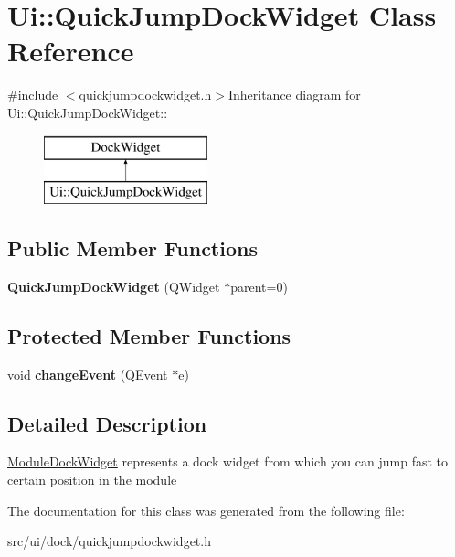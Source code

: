 \hypertarget{classUi_1_1QuickJumpDockWidget}{
\section{Ui::QuickJumpDockWidget Class Reference}
\label{classUi_1_1QuickJumpDockWidget}
}


{\ttfamily \#include $<$quickjumpdockwidget.h$>$}Inheritance diagram for Ui::QuickJumpDockWidget::\begin{figure}[H]
\begin{center}
\leavevmode
\includegraphics[height=2cm]{classUi_1_1QuickJumpDockWidget}
\end{center}
\end{figure}
\subsection*{Public Member Functions}
\begin{DoxyCompactItemize}
\item 
\hypertarget{classUi_1_1QuickJumpDockWidget_a1e8fdb124c87cce47f03634e7721a7e0}{
{\bfseries QuickJumpDockWidget} (QWidget $\ast$parent=0)}
\label{classUi_1_1QuickJumpDockWidget_a1e8fdb124c87cce47f03634e7721a7e0}

\end{DoxyCompactItemize}
\subsection*{Protected Member Functions}
\begin{DoxyCompactItemize}
\item 
\hypertarget{classUi_1_1QuickJumpDockWidget_a548ca89b6936292be2e618572e62f04a}{
void {\bfseries changeEvent} (QEvent $\ast$e)}
\label{classUi_1_1QuickJumpDockWidget_a548ca89b6936292be2e618572e62f04a}

\end{DoxyCompactItemize}


\subsection{Detailed Description}
\hyperlink{classUi_1_1ModuleDockWidget}{ModuleDockWidget} represents a dock widget from which you can jump fast to certain position in the module 

The documentation for this class was generated from the following file:\begin{DoxyCompactItemize}
\item 
src/ui/dock/quickjumpdockwidget.h\end{DoxyCompactItemize}
